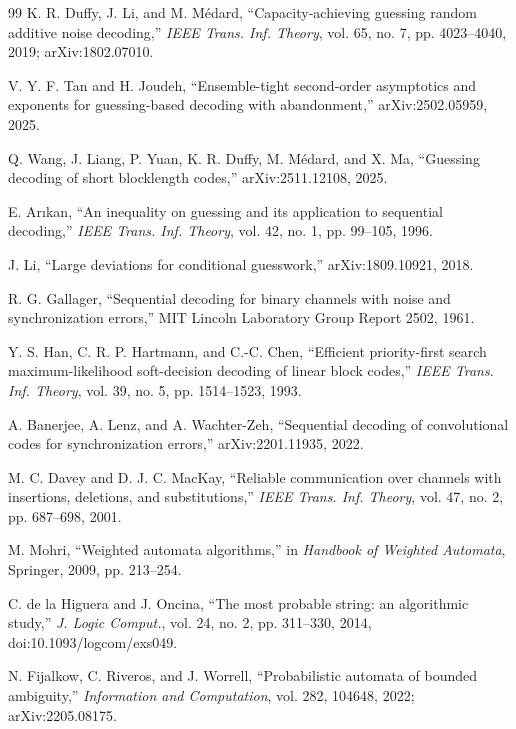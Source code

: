 \documentclass[11pt]{article}
\theoremstyle{definition}
\theoremstyle{remark}
\begin{document}
\begin{thebibliography}{99}
K. R. Duffy, J. Li, and M. M\'edard, ``Capacity-achieving guessing random additive noise decoding,'' \emph{IEEE Trans. Inf. Theory}, vol. 65, no. 7, pp. 4023--4040, 2019; arXiv:1802.07010.

V. Y. F. Tan and H. Joudeh, ``Ensemble-tight second-order asymptotics and exponents for guessing-based decoding with abandonment,'' arXiv:2502.05959, 2025.

Q. Wang, J. Liang, P. Yuan, K. R. Duffy, M. M\'edard, and X. Ma, ``Guessing decoding of short blocklength codes,'' arXiv:2511.12108, 2025.

E. Ar\i kan, ``An inequality on guessing and its application to sequential decoding,'' \emph{IEEE Trans. Inf. Theory}, vol. 42, no. 1, pp. 99--105, 1996.

J. Li, ``Large deviations for conditional guesswork,'' arXiv:1809.10921, 2018.

R. G. Gallager, ``Sequential decoding for binary channels with noise and synchronization errors,'' MIT Lincoln Laboratory Group Report 2502, 1961.

Y. S. Han, C. R. P. Hartmann, and C.-C. Chen, ``Efficient priority-first search maximum-likelihood soft-decision decoding of linear block codes,'' \emph{IEEE Trans. Inf. Theory}, vol. 39, no. 5, pp. 1514--1523, 1993.

A. Banerjee, A. Lenz, and A. Wachter-Zeh, ``Sequential decoding of convolutional codes for synchronization errors,'' arXiv:2201.11935, 2022.

M. C. Davey and D. J. C. MacKay, ``Reliable communication over channels with insertions, deletions, and substitutions,'' \emph{IEEE Trans. Inf. Theory}, vol. 47, no. 2, pp. 687--698, 2001.

M. Mohri, ``Weighted automata algorithms,'' in \emph{Handbook of Weighted Automata}, Springer, 2009, pp. 213--254.

C. de la Higuera and J. Oncina, ``The most probable string: an algorithmic study,'' \emph{J. Logic Comput.}, vol. 24, no. 2, pp. 311--330, 2014, doi:10.1093/logcom/exs049.

N. Fijalkow, C. Riveros, and J. Worrell, ``Probabilistic automata of bounded ambiguity,'' \emph{Information and Computation}, vol. 282, 104648, 2022; arXiv:2205.08175.


\end{thebibliography}
\end{document}
